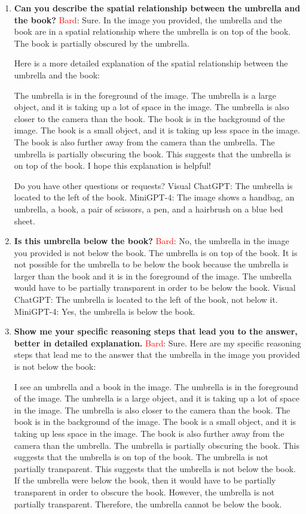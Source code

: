 \begin{enumerate}
    \item \textbf{Can you describe the spatial relationship between the umbrella and the book?}
    \subitem \textcolor{Red}{Bard}: 
    Sure. In the image you provided, the umbrella and the book are in a spatial relationship where the umbrella is on top of the book. The book is partially obscured by the umbrella.
    
    Here is a more detailed explanation of the spatial relationship between the umbrella and the book:
    
    The umbrella is in the foreground of the image. The umbrella is a large object, and it is taking up a lot of space in the image. The umbrella is also closer to the camera than the book.
    The book is in the background of the image. The book is a small object, and it is taking up less space in the image. The book is also further away from the camera than the umbrella.
    The umbrella is partially obscuring the book. This suggests that the umbrella is on top of the book.
    I hope this explanation is helpful!
    
    Do you have other questions or requests?
    \subitem Visual ChatGPT: The umbrella is located to the left of the book.
    \subitem MiniGPT-4: The image shows a handbag, an umbrella, a book, a pair of scissors, a pen, and a hairbrush on a blue bed sheet.
    \item \textbf{Is this umbrella below the book?}
    \subitem \textcolor{Red}{Bard}: 
    No, the umbrella in the image you provided is not below the book. The umbrella is on top of the book. It is not possible for the umbrella to be below the book because the umbrella is larger than the book and it is in the foreground of the image. The umbrella would have to be partially transparent in order to be below the book.
    \subitem Visual ChatGPT: The umbrella is located to the left of the book, not below it.
    \subitem MiniGPT-4: Yes, the umbrella is below the book.
    \item \textbf{Show me your specific reasoning steps that lead you to the answer, better in detailed explanation.}
    \subitem \textcolor{Red}{Bard}: 
    Sure. Here are my specific reasoning steps that lead me to the answer that the umbrella in the image you provided is not below the book:
    
    I see an umbrella and a book in the image.
    The umbrella is in the foreground of the image. The umbrella is a large object, and it is taking up a lot of space in the image. The umbrella is also closer to the camera than the book.
    The book is in the background of the image. The book is a small object, and it is taking up less space in the image. The book is also further away from the camera than the umbrella.
    The umbrella is partially obscuring the book. This suggests that the umbrella is on top of the book.
    The umbrella is not partially transparent. This suggests that the umbrella is not below the book.
    If the umbrella were below the book, then it would have to be partially transparent in order to obscure the book. However, the umbrella is not partially transparent. Therefore, the umbrella cannot be below the book.
    

\end{enumerate}
